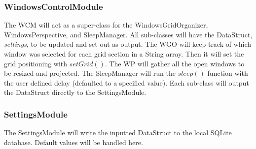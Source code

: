 \documentclass[titlepage]{article}
\begin{document}
\subsubsection{WindowsControlModule}
The WCM will act as a super-class for the WindowsGridOrganizer, WindowsPerspective, and SleepManager. All sub-classes will have the DataStruct, \textit{settings}, to be updated and set out as output. The WGO will keep track of which window was selected for each grid section in a String array. Then it will set the grid positioning with $setGrid()$. The WP will gather all the open windows to be resized and projected. The SleepManager will run the $sleep()$ function with the user defined delay (defaulted to a specified value). Each sub-class will output the DataStruct directly to the SettingsModule. 

\subsubsection{SettingsModule}
The SettingsModule will write the inputted DataStruct to the local SQLite database. Default values will be handled here.
\end{document}
